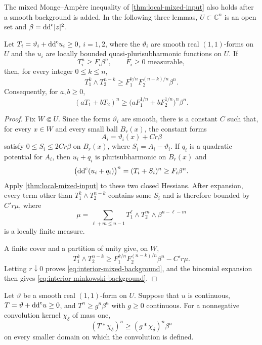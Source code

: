 

The mixed Monge--Amp\`ere inequality of \cref{thm:local-mixed-input} also holds after a smooth background is added. In the following three lemmas, $U\subset\mathbb C^n$ is an open set and $\beta=\mathrm{dd}^{\mathrm{c}}|z|^2$.

\begin{lemma}\label{lem:interior-mixed-background}\label{lem:nonclosed-mixed-density}
Let $T_i=\vartheta_i+\mathrm{dd}^{\mathrm{c}} u_i\geq0$, $i=1,2$, where the $\vartheta_i$ are smooth real $(1,1)$-forms on $U$ and the $u_i$ are locally bounded quasi-plurisubharmonic functions on $U$. If
\[
  T_i^n\geq F_i\beta^n,
  \qquad F_i\geq0\text{ measurable},
\]
then, for every integer $0\leq k\leq n$,
\begin{equation}\label{eq:interior-mixed-background}
  T_1^k\wedge T_2^{n-k}
  \geq F_1^{k/n}F_2^{(n-k)/n}\beta^n.
\end{equation}
Consequently, for $a,b\geq0$,
\begin{equation}\label{eq:interior-minkowski-background}
  (aT_1+bT_2)^n
  \geq\bigl(aF_1^{1/n}+bF_2^{1/n}\bigr)^n\beta^n.
\end{equation}
\end{lemma}

\begin{proof}
Fix $W\Subset U$. Since the forms $\vartheta_i$ are smooth, there is a constant $C$ such that, for every $x\in W$ and every small ball $B_r(x)$, the constant forms
\[
  A_i=\vartheta_i(x)+Cr\beta
\]
satisfy $0\leq S_i\leq2Cr\beta$ on $B_r(x)$, where $S_i=A_i-\vartheta_i$. If $q_i$ is a quadratic potential for $A_i$, then $u_i+q_i$ is plurisubharmonic on $B_r(x)$ and
\[
  \bigl(\mathrm{dd}^{\mathrm{c}}(u_i+q_i)\bigr)^n=(T_i+S_i)^n\geq F_i\beta^n.
\]
Apply \cref{thm:local-mixed-input} to these two closed Hessians. After expansion, every term other than $T_1^k\wedge T_2^{n-k}$ contains some $S_i$ and is therefore bounded by $C'r\mu$, where
\[
  \mu=\sum_{\ell+m\leq n-1}T_1^\ell\wedge T_2^m\wedge\beta^{n-\ell-m}
\]
is a locally finite measure.

A finite cover and a partition of unity give, on $W$,
\[
  T_1^k\wedge T_2^{n-k}
  \geq F_1^{k/n}F_2^{(n-k)/n}\beta^n-C'r\mu.
\]
Letting $r\downarrow0$ proves \eqref{eq:interior-mixed-background}, and the binomial expansion then gives \eqref{eq:interior-minkowski-background}.
\end{proof}

\begin{lemma}\label{lem:interior-convolution}
Let $\vartheta$ be a smooth real $(1,1)$-form on $U$. Suppose that $u$ is continuous, $T=\vartheta+\mathrm{dd}^{\mathrm{c}} u\geq0$, and $T^n\geq g^n\beta^n$ with $g\geq0$ continuous. For a nonnegative convolution kernel $\chi_\delta$ of mass one,
\begin{equation}\label{eq:interior-convolution}
  (T*\chi_\delta)^n\geq(g*\chi_\delta)^n\beta^n
\end{equation}
on every smaller domain on which the convolution is defined.
\end{lemma}

